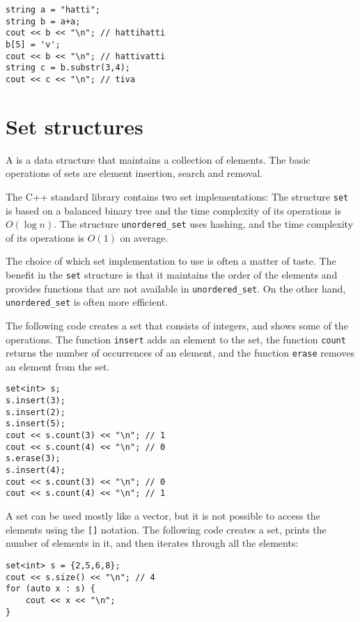 \begin{lstlisting}
string a = "hatti";
string b = a+a;
cout << b << "\n"; // hattihatti
b[5] = 'v';
cout << b << "\n"; // hattivatti
string c = b.substr(3,4);
cout << c << "\n"; // tiva
\end{lstlisting}

\section{Set structures}


A  is a data structure that
maintains a collection of elements.
The basic operations of sets are element
insertion, search and removal.

The C++ standard library contains two set
implementations:
The structure \texttt{set} is based on a balanced
binary tree and the time complexity of its
operations is $O(\log n)$.
The structure \texttt{unordered\_set} uses hashing,
and the time complexity of its operations is $O(1)$ on average.

The choice of which set implementation to use
is often a matter of taste.
The benefit in the \texttt{set} structure
is that it maintains the order of the elements
and provides functions that are not available
in \texttt{unordered\_set}.
On the other hand, \texttt{unordered\_set} is
often more efficient.

The following code creates a set
that consists of integers,
and shows some of the operations.
The function \texttt{insert} adds an element to the set,
the function \texttt{count} returns the number of occurrences
of an element,
and the function \texttt{erase} removes an element from the set.

\begin{lstlisting}
set<int> s;
s.insert(3);
s.insert(2);
s.insert(5);
cout << s.count(3) << "\n"; // 1
cout << s.count(4) << "\n"; // 0
s.erase(3);
s.insert(4);
cout << s.count(3) << "\n"; // 0
cout << s.count(4) << "\n"; // 1
\end{lstlisting}

A set can be used mostly like a vector,
but it is not possible to access
the elements using the \texttt{[]} notation.
The following code creates a set,
prints the number of elements in it, and then
iterates through all the elements:
\begin{lstlisting}
set<int> s = {2,5,6,8};
cout << s.size() << "\n"; // 4
for (auto x : s) {
    cout << x << "\n";
}
\end{lstlisting}

